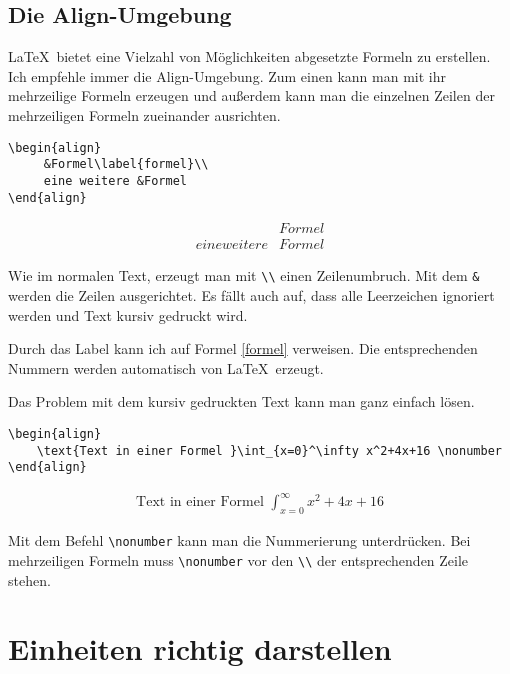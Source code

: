 \subsection{Die Align-Umgebung}

\LaTeX\ bietet eine Vielzahl von Möglichkeiten abgesetzte Formeln zu erstellen. Ich empfehle immer die Align-Umgebung. Zum einen kann man mit ihr mehrzeilige Formeln erzeugen und außerdem kann man die einzelnen Zeilen der mehrzeiligen Formeln zueinander ausrichten.

\begin{verbatim}
\begin{align}
     &Formel\label{formel}\\
     eine weitere &Formel
\end{align}
\end{verbatim}

\begin{align}
    &Formel\label{formel}\\
    eine weitere &Formel
\end{align}

Wie im normalen Text, erzeugt man mit \verb+\\+ einen Zeilenumbruch. Mit dem \verb+&+ werden die Zeilen ausgerichtet. Es fällt auch auf, dass alle Leerzeichen ignoriert werden und Text kursiv gedruckt wird.

Durch das Label kann ich auf Formel \ref{formel} verweisen. Die entsprechenden Nummern werden automatisch von \LaTeX\ erzeugt.

Das Problem mit dem kursiv gedruckten Text kann man ganz einfach lösen.

\begin{verbatim}
\begin{align}
    \text{Text in einer Formel }\int_{x=0}^\infty x^2+4x+16 \nonumber
\end{align}
\end{verbatim}

\begin{align}
    \text{Text in einer Formel }\int_{x=0}^\infty x^2+4x+16 \nonumber
\end{align}

Mit dem Befehl \verb+\nonumber+ kann man die Nummerierung unterdrücken. Bei mehrzeiligen Formeln muss \verb+\nonumber+ vor den \verb+\\+ der entsprechenden Zeile stehen.

\section{Einheiten richtig darstellen}

